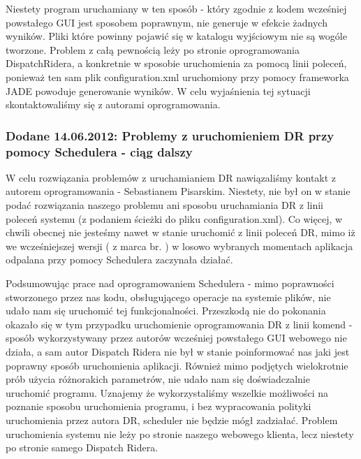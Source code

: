 Niestety program uruchamiany w ten sposób - który zgodnie z kodem wcześniej powstałego GUI jest sposobem poprawnym, nie generuje w efekcie żadnych wyników. Pliki które powinny pojawić się w katalogu wyjściowym nie są wogóle tworzone. Problem z całą pewnością leży po stronie oprogramowania DispatchRidera, a konkretnie w sposobie uruchomienia za pomocą linii poleceń, ponieważ ten sam plik configuration.xml uruchomiony przy pomocy frameworka JADE powoduje generowanie wyników. W celu wyjaśnienia tej sytuacji skontaktowaliśmy się z autorami oprogramowania.

\subsubsection{Dodane 14.06.2012: Problemy z uruchomieniem DR przy pomocy Schedulera - ciąg dalszy}

W celu rozwiązania problemów z uruchamianiem DR nawiązaliśmy kontakt z autorem oprogramowania - Sebastianem Pisarskim. Niestety, nie był on w stanie podać rozwiązania naszego problemu ani sposobu uruchamiania DR z linii poleceń systemu (z podaniem ścieżki do pliku configuration.xml). Co więcej, w chwili obecnej nie jesteśmy nawet w stanie uruchomić z linii poleceń DR, mimo iż we wcześniejszej wersji ( z marca br. ) w losowo wybranych momentach aplikacja odpalana przy pomocy Schedulera zaczynała działać.

Podsumowując prace nad oprogramowaniem Schedulera - mimo poprawności stworzonego przez nas kodu, obsługującego operacje na systemie plików, nie udało nam się uruchomić tej funkcjonalności. Przeszkodą nie do pokonania okazało się w tym przypadku uruchomienie oprogramowania DR z linii komend - sposób wykorzystywany przez autorów wcześniej powstałego GUI webowego nie działa, a sam autor Dispatch Ridera nie był w stanie poinformować nas jaki jest poprawny sposób uruchomienia aplikacji. Również mimo podjętych wielokrotnie prób użycia różnorakich parametrów, nie udało nam się doświadczalnie uruchomić programu. Uznajemy że wykorzystaliśmy wszelkie możliwości na poznanie sposobu uruchomienia programu, i bez wypracowania polityki uruchomienia przez autora DR, scheduler nie będzie mógł zadziałać. Problem uruchomienia systemu nie leży po stronie naszego webowego klienta, lecz niestety po stronie samego Dispatch Ridera.